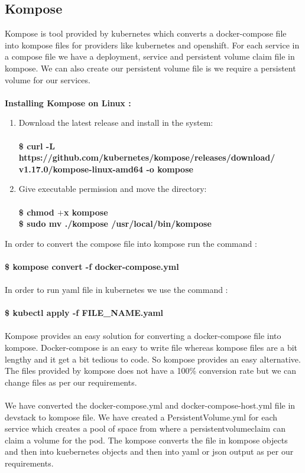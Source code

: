 \documentclass[12pt]{report}
\begin{document}
\subsection{Kompose}
Kompose is tool provided by kubernetes which converts a docker-compose file into kompose files for providers like kubernetes and openshift. For each service in a compose file we have a deployment, service and persistent volume claim file in kompose. We can also create our persistent volume file is we require a persistent volume for our services.\\\\
\textbf{Installing Kompose on Linux :}
\begin{enumerate}
	\item Download the latest release and install in the system:\\\\
	\textbf{\$ curl -L https://github.com/kubernetes/kompose/releases/download/\\v1.17.0/kompose-linux-amd64 -o kompose}
	\item Give executable permission and move the directory:\\\\
	\textbf{\$ chmod $+$x kompose\\
		\$ sudo mv ./kompose /usr/local/bin/kompose}
\end{enumerate}
In order to convert the compose file into kompose run the command :\\\\
\textbf{\$ kompose convert -f docker-compose.yml}\\\\
In order to run yaml file in kubernetes we use the command :\\\\
\textbf{\$ kubectl apply -f FILE\_NAME.yaml}\\\\
Kompose provides an easy solution for  converting a docker-compose file into kompose. Docker-compose is an easy to write file whereas kompose files are a bit lengthy and it get a bit tedious to code. So kompose provides an easy alternative. The files provided by kompose does not have a 100\% conversion rate but we can change files as per our requirements.\\\\
We have converted the docker-compose.yml and docker-compose-host.yml file in devstack to kompose file. We have created a PersistentVolume.yml for each service which creates a pool of space from where a persistentvolumeclaim can claim a volume for the pod. The kompose converts the file in kompose objects and then into kuebernetes objects and then into yaml or json output as per our requirements.
\end{document}
